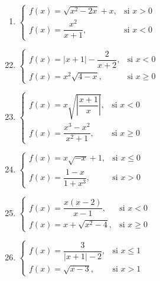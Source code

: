 \documentclass{article}
\begin{document}
\begin{multicols}{3}
\begin{enumerate}
    \item $\left\{
        \begin{array}{ll}
            f(x) = \sqrt{x^2 - 2x} + x, & \text{si } x > 0 \\
            f(x) = \dfrac{x^2}{x+1}, & \text{si } x < 0
        \end{array}
    \right.$
\end{enumerate}

\columnbreak

\begin{enumerate}
    \setcounter{enumi}{21}
    \item $\left\{
        \begin{array}{ll}
            f(x) = |x + 1| - \dfrac{2}{x+2}, & \text{si } x < 0 \\
            f(x) = x^2 \sqrt{4 - x}, & \text{si } x \geq 0
        \end{array}
    \right.$
    
    \item $\left\{
        \begin{array}{ll}
            f(x) = x \sqrt{\left| \dfrac{x+1}{x} \right|}, & \text{si } x < 0 \\
            f(x) = \dfrac{x^3 - x^2}{x^2 + 1}, & \text{si } x \geq 0
        \end{array}
    \right.$
    
    \item $\left\{
        \begin{array}{ll}
            f(x) = x\sqrt{-x} + 1, & \text{si } x \leq 0 \\
            f(x) = \dfrac{1 - x}{1 + x^3}, & \text{si } x > 0
        \end{array}
    \right.$
    
    \item $\left\{
        \begin{array}{ll}
            f(x) = \dfrac{x(x-2)}{x-1}, & \text{si } x < 0 \\
            f(x) = x + \sqrt{x^2 - 4}, & \text{si } x \geq 0
        \end{array}
    \right.$
    
    \item $\left\{
        \begin{array}{ll}
            f(x) = \dfrac{3}{|x+1| - 2}, & \text{si } x \leq 1 \\
            f(x) = \sqrt{x - 3}, & \text{si } x > 1
        \end{array}
    \right.$
\end{enumerate}
\end{multicols}
\end{document}

